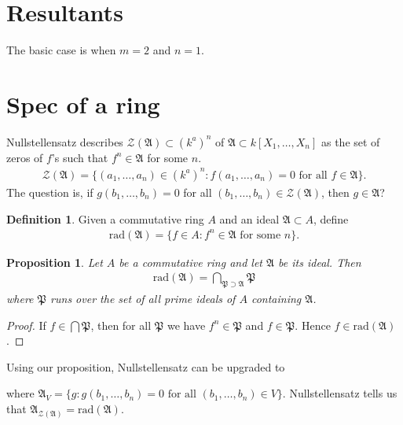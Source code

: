 \documentclass[12pt]{report}
\theoremstyle{plain}
\newtheorem{proposition}[theorem]{Proposition}
\theoremstyle{remark}
\theoremstyle{definition}
\newtheorem{definition}[theorem]{Definition}
\begin{document}
\clearpage
\section{Resultants}
The basic case is when $m=2$ and $n=1$. 


\clearpage
\section{Spec of a ring}

Nullstellensatz describes $\mathcal{Z}(\mathfrak{A})\subset (k^a)^n$ of $\mathfrak{A}\subset k[X_1,\dots,X_n]$ as the set of zeros of $f$'s such that $f^n\in\mathfrak{A}$ for some $n$.
\begin{align*}
    \mathcal{Z}(\mathfrak{A})=\{(a_1,\dots,a_n)\in (k^a)^n:f(a_1,\dots,a_n)=0\text{ for all }f\in\mathfrak{A}\}.
\end{align*}
The question is, if $g(b_1,\dots,b_n)=0$ for all $(b_1,\dots,b_n)\in\mathcal{Z}(\mathfrak{A})$, then $g\in\mathfrak{A}$? \\

\begin{definition}
    Given a commutative ring $A$ and an ideal $\mathfrak{A}\subset A$, define
    \begin{align*}
        \mathrm{rad}(\mathfrak{A})=\{f\in A:f^n\in\mathfrak{A}\text{ for some }n\}.
    \end{align*}
\end{definition}

\begin{proposition}
    Let $A$ be a commutative ring and let $\mathfrak{A}$ be its ideal. Then
    \begin{align*}
        \mathrm{rad}(\mathfrak{A})=\bigcap_{\mathfrak{P}\supset\mathfrak{A}}\mathfrak{P}
    \end{align*}
    where $\mathfrak{P}$ runs over the set of all prime ideals of $A$ containing $\mathfrak{A}$.
\end{proposition}
\begin{proof}
    If $f\in\bigcap \mathfrak{P}$, then for all $\mathfrak{P}$ we have $f^n\in\mathfrak{P}$ and $f\in\mathfrak{P}$. Hence $f\in\mathrm{rad}(\mathfrak{A})$.
\end{proof}

Using our proposition, Nullstellensatz can be upgraded to
\begin{figure}[H]
    \centering
\end{figure}
\noindent where $\mathfrak{A}_V=\{g:g(b_1,\dots,b_n)=0\text{ for all }(b_1,\dots,b_n)\in V\}$. Nullstellensatz tells us that $\mathfrak{A}_{\mathcal{Z}(\mathfrak{A})}=\mathrm{rad}(\mathfrak{A})$.\\
\end{document}
